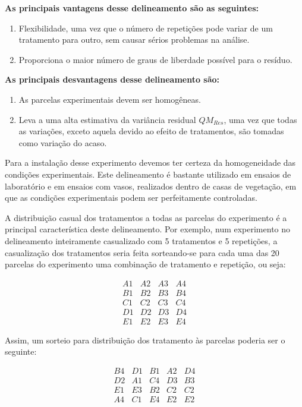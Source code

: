 \documentclass[
]{book}
\begin{document}
\textbf{As principais vantagens desse delineamento são as seguintes:}

\begin{enumerate}
\def\labelenumi{\arabic{enumi})}
\item
  Flexibilidade, uma vez que o número de repetições pode variar de um tratamento para outro, sem causar sérios problemas na análise.
\item
  Proporciona o maior número de graus de liberdade possível para o resíduo.
\end{enumerate}

\textbf{As principais desvantagens desse delineamento são:}

\begin{enumerate}
\def\labelenumi{\arabic{enumi})}
\item
  As parcelas experimentais devem ser homogêneas.
\item
  Leva a uma alta estimativa da variância residual \(QM_{Res}\), uma vez que todas as variações, exceto aquela devido ao efeito de tratamentos, são tomadas como variação do acaso.
\end{enumerate}

Para a instalação desse experimento devemos ter certeza da homogeneidade das condições experimentais. Este delineamento é bastante utilizado em ensaios de laboratório e em ensaios com vasos, realizados dentro de casas de vegetação, em que as condições experimentais podem ser perfeitamente controladas.

A distribuição casual dos tratamentos a todas as parcelas do experimento é a principal característica deste delineamento. Por exemplo, num experimento no delineamento inteiramente casualizado com 5 tratamentos e 5 repetições, a casualização dos tratamentos seria feita sorteando-se para cada uma das 20 parcelas do experimento uma combinação de tratamento e repetição, ou seja:

\[
\begin{matrix}
A1 & A2 & A3 & A4 \\
B1 & B2 & B3 & B4 \\
C1 & C2 & C3 & C4 \\
D1 & D2 & D3 & D4 \\
E1 & E2 & E3 & E4 
\end{matrix}
\]

Assim, um sorteio para distribuição dos tratamento às parcelas poderia ser o seguinte:

\[
\begin{matrix}
B4 & D1 & B1 & A2 & D4\\
D2 & A1 & C4 & D3 & B3\\
E1 & E3 & B2 & C2 & C2\\
A4 & C1 & E4 & E2 & E2
\end{matrix}
\]
\end{document}
